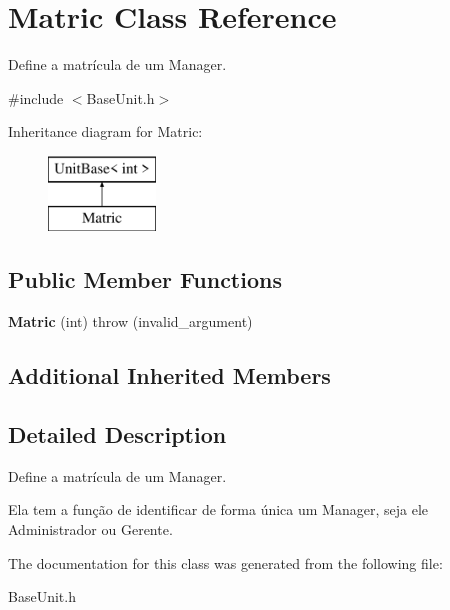 \hypertarget{classMatric}{\section{Matric Class Reference}
\label{classMatric}
}


Define a matrícula de um Manager.  




{\ttfamily \#include $<$Base\-Unit.\-h$>$}

Inheritance diagram for Matric\-:\begin{figure}[H]
\begin{center}
\leavevmode
\includegraphics[height=2.000000cm]{classMatric}
\end{center}
\end{figure}
\subsection*{Public Member Functions}
\begin{DoxyCompactItemize}
\item 
\hypertarget{classMatric_a0f74486adf618928641729a73ee76286}{{\bfseries Matric} (int)  throw (invalid\-\_\-argument)}\label{classMatric_a0f74486adf618928641729a73ee76286}

\end{DoxyCompactItemize}
\subsection*{Additional Inherited Members}


\subsection{Detailed Description}
Define a matrícula de um Manager. 

Ela tem a função de identificar de forma única um Manager, seja ele Administrador ou Gerente. 

The documentation for this class was generated from the following file\-:\begin{DoxyCompactItemize}
\item 
Base\-Unit.\-h\end{DoxyCompactItemize}
